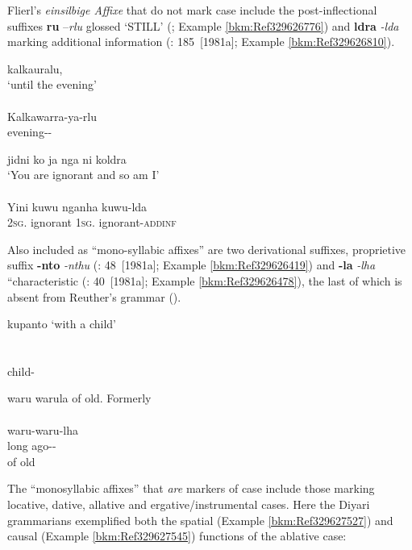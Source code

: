 Flierl’s \textit{einsilbige Affixe} that do not mark case include the post-inflectional suffixes \textbf{ru} –\textit{rlu} glossed `STILL' (\citealt[181]{austin_grammar_2013}; Example \ref{bkm:Ref329626776}) and \textbf{ldra} \textit{{}-lda} marking additional information (\citealt{austin_grammar_2013}: 185~[1981a]; Example \ref{bkm:Ref329626810}).

\newpage
\ea\label{bkm:Ref329626776}
	kalkauralu, \\
	\glt `until the evening' \\
	\citep[52]{flierl_dieri_1880} \\
	\gll Kalkawarra-ya-rlu\\
	evening--\\
\z

\ea\label{bkm:Ref329626810}
	jidni ko ja nga ni koldra \\
	\glt `You are ignorant and so am I' \\
	\citep[52]{flierl_dieri_1880} \\
	\gll Yini          kuwu         nganha          kuwu-lda\\
	2\textsc{sg}.    ignorant    1\textsc{sg}.        ignorant-\textsc{addinf}\\
\z

\largerpage
Also included as “mono-syllabic affixes” are two derivational suffixes, proprietive suffix \textbf{-nto} \textit{-nthu} (\citealt{austin_grammar_2013}: 48~[1981a]; Example \ref{bkm:Ref329626419}) and \textbf{-la} \textit{-lha} “characteristic (\citealt{austin_grammar_2013}: 40~[1981a]; Example \ref{bkm:Ref329626478}), the last of which is absent from Reuther’s grammar (\citeyear{reuther_ms_1899}).

\ea\label{bkm:Ref329626419}
	kupanto
	\glt `with a child' \\
	\citep[52]{flierl_dieri_1880} \\
	\\
	child-\\
\z

\ea\label{bkm:Ref329626478}
	waru warula
	\glt of old. Formerly \\
	\citep[52]{flierl_dieri_1880} \\
	\gll waru-waru-lha \\
	{long ago--} \\
	\glt of old
\z

The “monosyllabic affixes” that \textit{are} markers of case include those marking locative, dative, allative and ergative/instrumental cases. Here the Diyari grammarians exemplified both the spatial (Example \ref{bkm:Ref329627527}) and causal (Example \ref{bkm:Ref329627545}) functions of the ablative case:

